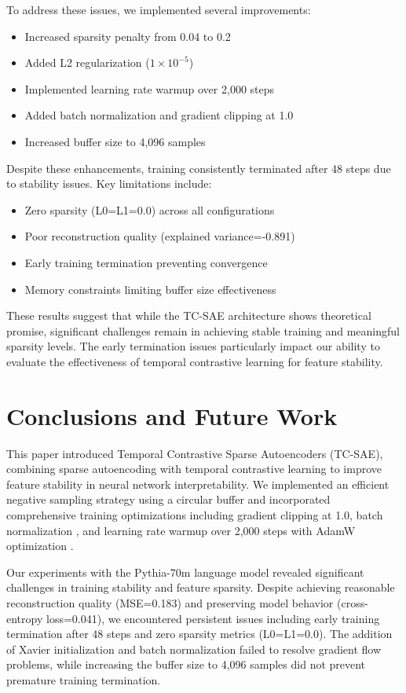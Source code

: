 \documentclass{article} %
\begin{document}
To address these issues, we implemented several improvements:
\begin{itemize}
    \item Increased sparsity penalty from 0.04 to 0.2
    \item Added L2 regularization ($1\times10^{-5}$)
    \item Implemented learning rate warmup over 2,000 steps
    \item Added batch normalization \cite{ba2016layer} and gradient clipping at 1.0
    \item Increased buffer size to 4,096 samples
\end{itemize}

Despite these enhancements, training consistently terminated after 48 steps due to stability issues. Key limitations include:
\begin{itemize}
    \item Zero sparsity (L0=L1=0.0) across all configurations
    \item Poor reconstruction quality (explained variance=-0.891)
    \item Early training termination preventing convergence
    \item Memory constraints limiting buffer size effectiveness
\end{itemize}

These results suggest that while the TC-SAE architecture shows theoretical promise, significant challenges remain in achieving stable training and meaningful sparsity levels. The early termination issues particularly impact our ability to evaluate the effectiveness of temporal contrastive learning for feature stability.

\section{Conclusions and Future Work}
\label{sec:conclusion}
This paper introduced Temporal Contrastive Sparse Autoencoders (TC-SAE), combining sparse autoencoding with temporal contrastive learning to improve feature stability in neural network interpretability. We implemented an efficient negative sampling strategy using a circular buffer and incorporated comprehensive training optimizations including gradient clipping at 1.0, batch normalization \cite{ba2016layer}, and learning rate warmup over 2,000 steps with AdamW optimization \cite{loshchilov2017adamw}.

Our experiments with the Pythia-70m language model \cite{radford2019language} revealed significant challenges in training stability and feature sparsity. Despite achieving reasonable reconstruction quality (MSE=0.183) and preserving model behavior (cross-entropy loss=0.041), we encountered persistent issues including early training termination after 48 steps and zero sparsity metrics (L0=L1=0.0). The addition of Xavier initialization and batch normalization failed to resolve gradient flow problems, while increasing the buffer size to 4,096 samples did not prevent premature training termination.
\end{document}

